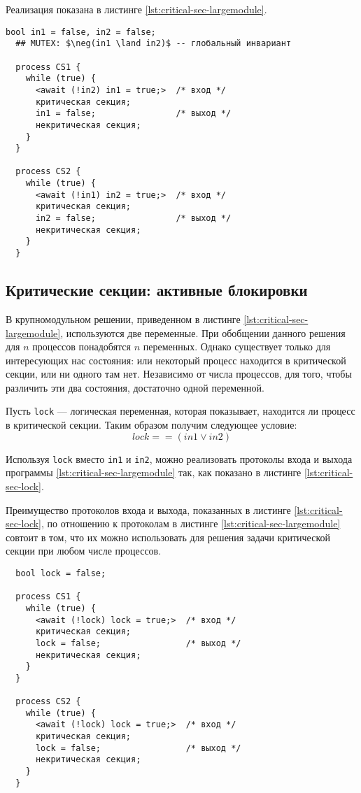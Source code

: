 Реализация показана в листинге \ref{lst:critical-sec-largemodule}.

\lstset{label=lst:critical-sec-largemodule,
  caption=Задача критической секции: крупномодульное решение}
\begin{lstlisting}[mathescape]
  bool in1 = false, in2 = false;
  ## MUTEX: $\neg(in1 \land in2)$ -- глобальный инвариант

  process CS1 {
    while (true) {
      <await (!in2) in1 = true;>  /* вход */
      критическая секция;
      in1 = false;                /* выход */
      некритическая секция;
    }
  }

  process CS2 {
    while (true) {
      <await (!in1) in2 = true;>  /* вход */
      критическая секция;
      in2 = false;                /* выход */
      некритическая секция;
    }
  }
\end{lstlisting}



\subsection{Критические секции: активные блокировки}

В крупномодульном решении, приведенном в листинге
\ref{lst:critical-sec-largemodule}, используются две переменные. При обобщении
данного решения для $n$ процессов понадобятся $n$ переменных. Однако существует
только для интересующих нас состояния: или некоторый процесс находится в
критической секции, или ни одного там нет. Независимо от числа процессов, для
того, чтобы различить эти два состояния, достаточно одной переменной.

Пусть \texttt{lock} --- логическая переменная, которая показывает, находится ли
процесс в критической секции. Таким образом получим следующее условие:
\begin{equation*}
  lock == (in1 \lor in2)
\end{equation*}

Используя \texttt{lock} вместо \texttt{in1} и \texttt{in2}, можно реализовать
протоколы входа и выхода программы \ref{lst:critical-sec-largemodule} так, как
показано в листинге \ref{lst:critical-sec-lock}.

Преимущество протоколов входа и выхода, показанных в листинге
\ref{lst:critical-sec-lock}, по отношению к протоколам в листинге
\ref{lst:critical-sec-largemodule} совтоит в том, что их можно использовать для
решения задачи критической секции при любом числе процессов.

\lstset{label=lst:critical-sec-lock,
  caption=Критические секции на основе блокировок}
\begin{lstlisting}
  bool lock = false;

  process CS1 {
    while (true) {
      <await (!lock) lock = true;>  /* вход */
      критическая секция;
      lock = false;                 /* выход */
      некритическая секция;
    }
  }

  process CS2 {
    while (true) {
      <await (!lock) lock = true;>  /* вход */
      критическая секция;
      lock = false;                 /* выход */
      некритическая секция;
    }
  }
\end{lstlisting}



